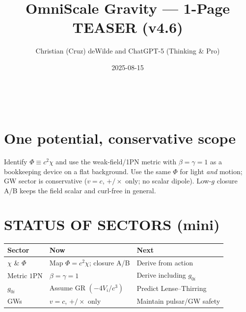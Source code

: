 \documentclass[
]{article}
\title{OmniScale Gravity --- 1-Page TEASER (v4.6)}
\author{\protect\phantomsection\label{_Hlk206169066}{}Christian (Cruz)
deWilde and ChatGPT-5 (Thinking \& Pro)}
\date{2025-08-15}
\begin{document}
\maketitle

~

\section{One potential, conservative
scope}\label{one-potential-conservative-scope}

Identify \(\Phi \equiv c^{2}\chi\) and use the weak-field/1PN metric
with \(\beta = \gamma = 1\) as a bookkeeping device on a flat
background. Use the same \(\Phi\) for light \emph{and} motion; GW sector
is conservative (\(v = c\), \(+ / \times\) only; no scalar dipole).
Low-\(g\) closure A/B keeps the field scalar and curl-free in general.

\section{STATUS OF SECTORS (mini)}\label{status-of-sectors-mini}

\begin{longtable}[]{@{}
  >{\raggedright\arraybackslash}p{}
  >{\raggedright\arraybackslash}p{}
  >{\raggedright\arraybackslash}p{}@{}}
\toprule\noalign{}
\begin{minipage}[b]{\linewidth}\raggedright
\textbf{Sector}
\end{minipage} & \begin{minipage}[b]{\linewidth}\raggedright
\textbf{Now}
\end{minipage} & \begin{minipage}[b]{\linewidth}\raggedright
\textbf{Next}
\end{minipage} \\
\midrule\noalign{}
\endhead
\bottomrule\noalign{}
\endlastfoot
\(\chi\) \& \(\Phi\) & Map \(\Phi = c^{2}\chi\); closure A/B & Derive
from action \\
Metric \(1\)PN & \(\beta = \gamma = 1\) & Derive including \(g_{0i}\) \\
\(g_{0i}\) & Assume GR \(( - 4V_{i}/c^{3})\) & Predict
Lense--Thirring \\
GWs & \(v = c\), \(+ / \times\) only & Maintain pulsar/GW safety \\
\end{longtable}
\end{document}
